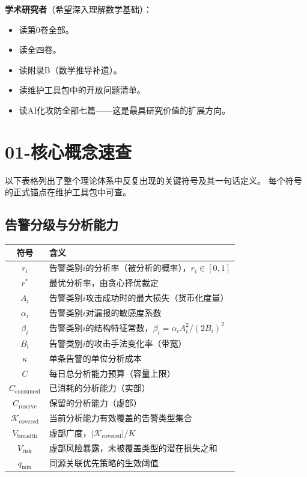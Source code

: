 \documentclass[11pt,a4paper]{article}
\begin{document}
\textbf{学术研究者}（希望深入理解数学基础）：
\begin{itemize}
    \item 读第0卷全部。
    \item 读全四卷。
    \item 读附录B（数学推导补遗）。
    \item 读维护工具包中的开放问题清单。
    \item 读AI化攻防全部七篇——这是最具研究价值的扩展方向。
\end{itemize}

\section{01-核心概念速查}

以下表格列出了整个理论体系中反复出现的关键符号及其一句话定义。
每个符号的正式锚点在维护工具包中可查。

\subsection{告警分级与分析能力}

\begin{center}
\begin{xltabular}{\textwidth}{c|X}
\toprule
\textbf{符号} & \textbf{含义} \\
\midrule
$r_i$ & 告警类别$i$的分析率（被分析的概率），$r_i \in [0,1]$ \\
$r^*$ & 最优分析率，由贪心择优裁定 \\
$A_i$ & 告警类别$i$攻击成功时的最大损失（货币化度量） \\
$\alpha_i$ & 告警类别$i$对漏报的敏感度系数 \\
$\beta_i$ & 告警类别$i$的结构特征常数，$\beta_i = \alpha_i A_i^2 / (2B_i)^2$ \\
$B_i$ & 告警类别$i$的攻击手法变化率（带宽） \\
$\kappa$ & 单条告警的单位分析成本 \\
$C$ & 每日总分析能力预算（容量上限） \\
$C_{\text{consumed}}$ & 已消耗的分析能力（实部） \\
$C_{\text{reserve}}$ & 保留的分析能力（虚部） \\
$\mathcal{K}_{\text{covered}}$ & 当前分析能力有效覆盖的告警类型集合 \\
$V_{\text{breadth}}$ & 虚部广度，$|\mathcal{K}_{\text{covered}}| / K$ \\
$V_{\text{risk}}$ & 虚部风险暴露，未被覆盖类型的潜在损失之和 \\
$q_{\min}$ & 同源关联优先策略的生效阈值 \\
\bottomrule
\end{xltabular}
\end{center}
\end{document}
